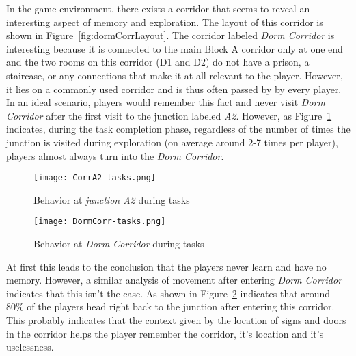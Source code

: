 In the game environment, there exists a corridor that seems to reveal an interesting aspect of memory and exploration. The layout of this corridor is shown in Figure~\ref{fig:dormCorrLayout}. The corridor labeled \emph{Dorm Corridor} is interesting because it is connected to the main Block A corridor only at one end and the two rooms on this corridor (D1 and D2) do not have a prison, a staircase, or any connections that make it at all relevant to the player. However, it lies on a commonly used corridor and is thus often passed by by every player. In an ideal scenario, players would remember this fact and never visit \emph{Dorm Corridor} after the first visit to the junction labeled \emph{A2}. However, as Figure~\ref{fig:junctionA2Behavior} indicates, during the task completion phase, regardless of the number of times the junction is visited during exploration (on average around 2-7 times per player), players almost always turn into the \emph{Dorm Corridor}.

\begin{figure}[tb]
    \begin{center}
        \texttt{[image: CorrA2-tasks.png]}
    \end{center}
    \caption{Behavior at \emph{junction A2} during tasks}
    \label{fig:junctionA2Behavior}
\end{figure}
\begin{figure}[tb]
    \begin{center}
        \texttt{[image: DormCorr-tasks.png]}
    \end{center}
    \caption{Behavior at \emph{Dorm Corridor} during tasks}
    \label{fig:dormCorrBehavior}
\end{figure}

At first this leads to the conclusion that the players never learn and have no memory. However, a similar analysis of movement after entering \emph{Dorm Corridor} indicates that this isn't the case. As shown in Figure~\ref{fig:dormCorrBehavior} indicates that around $80\%$ of the players head right back to the junction after entering this corridor. This probably indicates that the context given by the location of signs and doors in the corridor helps the player remember the corridor, it's location and it's uselessness.






